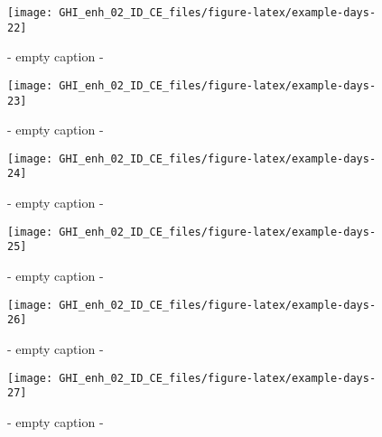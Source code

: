 \documentclass[
  10pt,
  a4paper,oneside]{article}
\begin{document}
\begin{figure}[H]

{\centering \texttt{[image: GHI\_enh\_02\_ID\_CE\_files/figure-latex/example-days-22]} 

}

\caption{ - empty caption - }\label{fig:example-days-22}
\end{figure}

\begin{figure}[H]

{\centering \texttt{[image: GHI\_enh\_02\_ID\_CE\_files/figure-latex/example-days-23]} 

}

\caption{ - empty caption - }\label{fig:example-days-23}
\end{figure}

\begin{figure}[H]

{\centering \texttt{[image: GHI\_enh\_02\_ID\_CE\_files/figure-latex/example-days-24]} 

}

\caption{ - empty caption - }\label{fig:example-days-24}
\end{figure}

\begin{figure}[H]

{\centering \texttt{[image: GHI\_enh\_02\_ID\_CE\_files/figure-latex/example-days-25]} 

}

\caption{ - empty caption - }\label{fig:example-days-25}
\end{figure}

\begin{figure}[H]

{\centering \texttt{[image: GHI\_enh\_02\_ID\_CE\_files/figure-latex/example-days-26]} 

}

\caption{ - empty caption - }\label{fig:example-days-26}
\end{figure}

\begin{figure}[H]

{\centering \texttt{[image: GHI\_enh\_02\_ID\_CE\_files/figure-latex/example-days-27]} 

}

\caption{ - empty caption - }\label{fig:example-days-27}
\end{figure}
\end{document}
